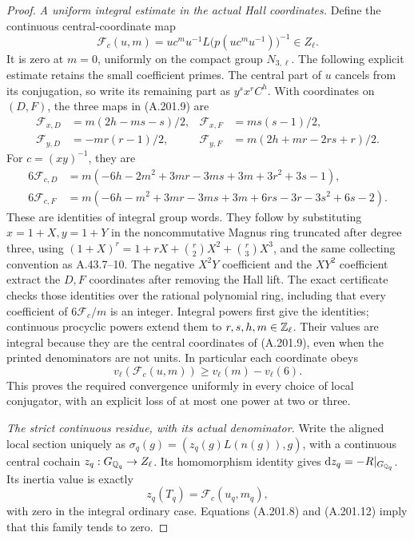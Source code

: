 \begin{proof}
\emph{A uniform integral estimate in the actual Hall coordinates.}
Define the continuous central-coordinate map
\[
 \mathcal F_c(u,m)=u c^m u^{-1}
                  L\bigl(p(u c^m u^{-1})\bigr)^{-1}
                         \in Z_\ell.
\tag{A.201.9}
\]
It is zero at \(m=0\), uniformly on the compact group
\(N_{3,\ell}\).  The following explicit estimate retains
the small coefficient primes.  The central part of \(u\)
cancels from its conjugation, so write its remaining part as
\(y^sx^rC^h\).  With coordinates on \((D,F)\), the three
maps in (A.201.9) are
\[
\begin{aligned}
 \mathcal F_{x,D}&=m(2h-ms-s)/2,
 &\mathcal F_{x,F}&=ms(s-1)/2,\\
 \mathcal F_{y,D}&=-mr(r-1)/2,
 &\mathcal F_{y,F}&=m(2h+mr-2rs+r)/2.
\end{aligned}
\tag{A.201.10}
\]
For \(c=(xy)^{-1}\), they are
\[
\begin{aligned}
 6\mathcal F_{c,D}
    &=m(-6h-2m^2+3mr-3ms+3m+3r^2+3s-1),\\
 6\mathcal F_{c,F}
    &=m(-6h-m^2+3mr-3ms+3m+6rs-3r-3s^2+6s-2).
\end{aligned}
\tag{A.201.11}
\]
These are identities of integral group words.  They follow by
substituting \(x=1+X,y=1+Y\) in the noncommutative Magnus
ring truncated after degree three, using
\((1+X)^r=1+rX+\binom r2X^2+\binom r3X^3\), and the
same collecting convention as A.43.7--10.  The negative
\(X^2Y\) coefficient and the \(XY^2\) coefficient extract
the \(D,F\) coordinates after removing the Hall lift.
The exact certificate checks those identities over the rational
polynomial ring, including that every coefficient of
\(6\mathcal F_c/m\) is an integer.  Integral powers first
give the identities; continuous procyclic powers extend them
to \(r,s,h,m\in\mathbb Z_\ell\).  Their values are integral
because they are the central coordinates of (A.201.9), even
when the printed denominators are not units.  In particular
each coordinate obeys
\[
 v_\ell(\mathcal F_c(u,m))\ge
                  v_\ell(m)-v_\ell(6).
\tag{A.201.12}
\]
This proves the required convergence uniformly in every choice
of local conjugator, with an explicit loss of at most one
power at two or three.

\emph{The strict continuous residue, with its actual denominator.}
Write the aligned local section uniquely as
\(\sigma_q(g)=(z_q(g)L(n(g)),g)\), with a continuous
central cochain \(z_q:G_{\mathbb Q_q}\to Z_\ell\).
Its homomorphism identity gives
\(\mathrm dz_q=-R|_{G_{\mathbb Q_q}}\).  Its inertia value is
exactly
\[
                    z_q(T_q)=\mathcal F_c(u_q,m_q),
\tag{A.201.13}
\]
with zero in the integral ordinary case.  Equations
(A.201.8) and (A.201.12) imply that this family tends to zero.


\end{proof}
